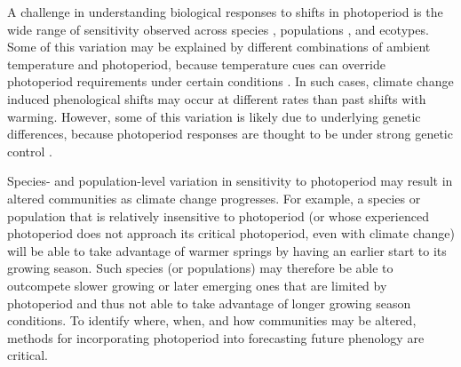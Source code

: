 \documentclass{article}
\begin{document}

\par A challenge in understanding biological responses to shifts in photoperiod is the wide range of sensitivity observed across species \citep{Sanz-Perez:2009aa, zohner2016,flynn2018}, populations \citep{tanino2010}, and ecotypes\citep{Howe:1995aa}. Some of this variation may be explained by different combinations of ambient temperature and photoperiod, because temperature cues can override photoperiod requirements under certain conditions \citep [e.g.,][] {tanino2010}. In such cases, climate change induced phenological shifts may occur at different rates than past shifts with warming. However, some of this variation is likely due to underlying genetic differences, because photoperiod responses are thought to be under strong genetic control \cite{bradshaw1995,weih2004,keller2011}. 
\par Species- and population-level variation in sensitivity to photoperiod may result in altered communities as climate change progresses. For example, a species or population that is relatively insensitive to photoperiod (or whose experienced photoperiod does not approach its critical photoperiod, even with climate change) will be able to take advantage of warmer springs by having an earlier start to its growing season. Such species (or populations) may therefore be able to outcompete slower growing or later emerging ones that are limited by photoperiod and thus not able to take advantage of longer growing season conditions. To identify where, when, and how communities may be altered, methods for incorporating photoperiod into forecasting future phenology are critical. 
\end{document}
